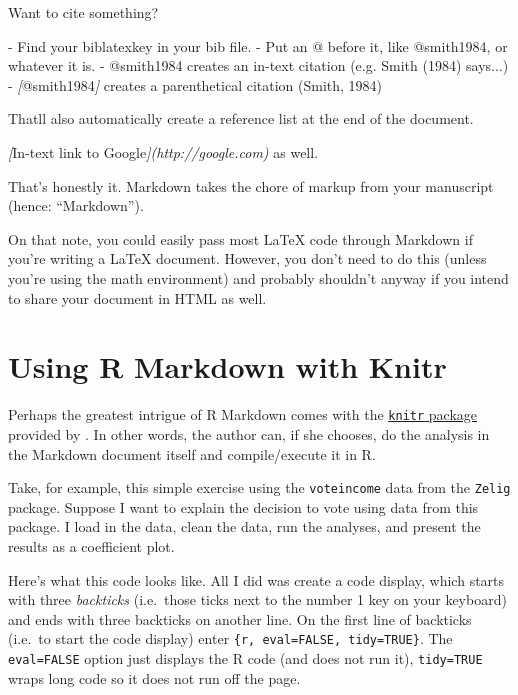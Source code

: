 \documentclass[11pt,]{article}
\newenvironment{Shaded}{\begin{snugshade}}{\end{snugshade}}
\newcommand{\CommentTok}[1]{\textcolor[rgb]{0.56,0.35,0.01}{\textit{#1}}}
\newcommand{\NormalTok}[1]{#1}
\newcommand{\OtherTok}[1]{\textcolor[rgb]{0.56,0.35,0.01}{#1}}
\newcommand{\SpecialStringTok}[1]{\textcolor[rgb]{0.31,0.60,0.02}{#1}}
\begin{document}
\begin{Shaded}
\begin{Highlighting}[]
\NormalTok{Want to cite something? }

\SpecialStringTok{{-} }\NormalTok{Find your biblatexkey in your bib file.}
\SpecialStringTok{{-} }\NormalTok{Put an @ before it, like @smith1984, or whatever it is.}
\SpecialStringTok{{-} }\NormalTok{@smith1984 creates an in{-}text citation (e.g. Smith (1984) says...)}
\SpecialStringTok{{-} }\CommentTok{[}\OtherTok{@smith1984}\CommentTok{]}\NormalTok{ creates a parenthetical citation (Smith, 1984)}

\NormalTok{That\textquotesingle{}ll also automatically create a reference list at the end of the document.}

\CommentTok{[}\OtherTok{In{-}text link to Google}\CommentTok{](http://google.com)}\NormalTok{ as well.}
\end{Highlighting}
\end{Shaded}

That's honestly it. Markdown takes the chore of markup from your
manuscript (hence: ``Markdown'').

On that note, you could easily pass most LaTeX code through Markdown if
you're writing a LaTeX document. However, you don't need to do this
(unless you're using the math environment) and probably shouldn't anyway
if you intend to share your document in HTML as well.

\hypertarget{using-r-markdown-with-knitr}{%
\section{Using R Markdown with
Knitr}\label{using-r-markdown-with-knitr}}

Perhaps the greatest intrigue of R Markdown comes with the
\href{http://yihui.name/knitr/}{\texttt{knitr} package} provided by
\citet{xie2013ddrk}. In other words, the author can, if she chooses, do
the analysis in the Markdown document itself and compile/execute it in
R.

Take, for example, this simple exercise using the \texttt{voteincome}
data from the \texttt{Zelig} package. Suppose I want to explain the
decision to vote using data from this package. I load in the data, clean
the data, run the analyses, and present the results as a coefficient
plot.

Here's what this code looks like. All I did was create a code display,
which starts with three \emph{backticks} (i.e.~those ticks next to the
number 1 key on your keyboard) and ends with three backticks on another
line. On the first line of backticks (i.e.~to start the code display)
enter \texttt{\{r,\ eval=FALSE,\ tidy=TRUE\}}. The \texttt{eval=FALSE}
option just displays the R code (and does not run it),
\texttt{tidy=TRUE} wraps long code so it does not run off the page.
\end{document}
